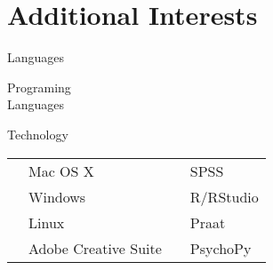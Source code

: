 
\section{Additional Interests}

{\color{UAred} Languages} \vspace{-.18in} \\


{\color{UAred} Programing\\ Languages} \vspace{-.37in} \\
\cventry{}{\LaTeX}{}{}{}{}
 

{\color{UAred} Technology} \\

\begin{tabular}{p{1.15in}lp{.7in}l}
   & Mac OS X             & & SPSS      \\ 
   & Windows              & & R/RStudio \\ 
   & Linux                & & Praat     \\ 
   & Adobe Creative Suite & & PsychoPy  \\ [2.5ex]
\end{tabular}
